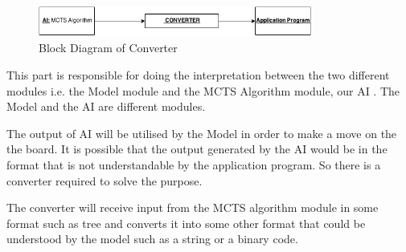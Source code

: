 \begin{figure}[H]
	\centering
	\includegraphics[width=0.80\textwidth]{2General_Architecture/2.2API/img/CONVERTER.png}
	\caption{Block Diagram of Converter}
	\label{fig:flowchart}
\end{figure}

This part is responsible for doing the interpretation between the two different modules i.e. the Model module and the MCTS Algorithm module, our AI . The Model and the AI are different modules. 

The output of AI will be utilised by the Model in order to make a move on the the board. It is possible that the output generated by the AI would be in the format that is not understandable by the application program. So there is a converter required to solve the purpose.

The converter will receive input from the MCTS algorithm module in some format such as tree and converts it into some other format that could be understood by the model such as a string or a binary code.
\newpage

